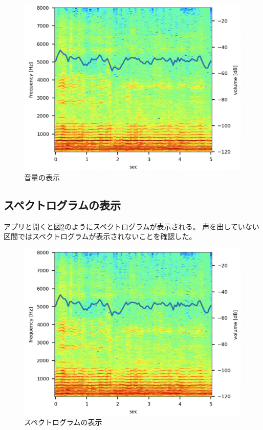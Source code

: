 \documentclass[a4paper,11pt]{jsarticle}
\begin{document}
\begin{figure}[h]
\centering
\includegraphics[keepaspectratio, width=13cm]
{./images/work3_spec_volume.png}
\caption{音量の表示}
\label{fig:volume}
\end{figure}

\newpage
\subsection{スペクトログラムの表示}
アプリと開くと図\ref{fig:spec}のようにスペクトログラムが表示される。
声を出していない区間ではスペクトログラムが表示されないことを確認した。

\begin{figure}[h]
\centering
\includegraphics[keepaspectratio, width=13cm]
{./images/work3_spec_volume.png}
\caption{スペクトログラムの表示}
\label{fig:spec}
\end{figure}
\end{document}

